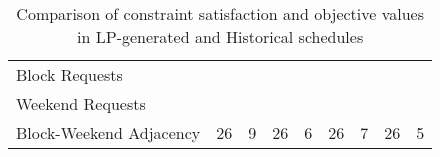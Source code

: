 \begin{table}[htbp]
\begin{tabular}{l|cc|cc|cc|cc}
		Block Requests                           &            &                       &            &                       &            &                       &            &                      \\
		Weekend Requests                         &            &                       &            &                       &            &                       &            &                      \\
		Block-Weekend Adjacency                  &     26     &           9           &     26     &           6           &     26     &           7           &     26     &          5
	\end{tabular}%
	\caption{Comparison of constraint satisfaction and objective values in LP-generated and Historical schedules}
	\label{tbl:constraints-comparison}%
\end{table}%
